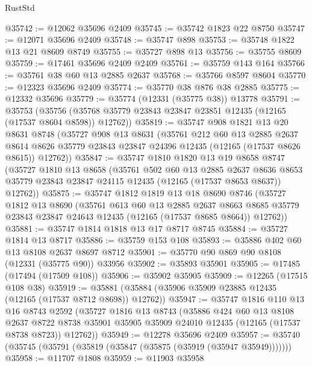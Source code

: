 \begin{lexlean}{RustStd}
\begin{coremodule}
@35742 := @12062 @35696 @2409
@35745 := @35742 @1823 @22 @8750
@35747 := @12071 @35696 @2409
@35748 := @35747 @898
@35753 := @35748 @1822 @13 @21 @8609 @8749
@35755 := @35727 @898 @13
@35756 := @35755 @8609
@35759 := @17461 @35696 @2409 @2409
@35761 := @35759 @143 @164
@35766 := @35761 @38 @60 @13 @2885 @2637
@35768 := @35766 @8597 @8604
@35770 := @12323 @35696 @2409
@35774 := @35770 @38 @876 @38 @2885
@35775 := @12332 @35696
@35779 := @35774 (@12331 (@35775 @38)) @13778
@35791 := @35753
    (@35756 (@35768 @35779 @23843 @23847 @23851 @12435 (@12165 (@17537 @8604 @8598)) @12762))
@35819 := @35747
    @908
    @1821
    @13
    @20
    @8631
    @8748
    (@35727
      @908
      @13
      @8631
      (@35761
        @212
        @60
        @13
        @2885
        @2637
        @8614
        @8626
        @35779
        @23843
        @23847
        @24396
        @12435
        (@12165 (@17537 @8626 @8615))
        @12762))
@35847 := @35747
    @1810
    @1820
    @13
    @19
    @8658
    @8747
    (@35727
      @1810
      @13
      @8658
      (@35761
        @502
        @60
        @13
        @2885
        @2637
        @8636
        @8653
        @35779
        @23843
        @23847
        @24115
        @12435
        (@12165 (@17537 @8653 @8637))
        @12762))
@35875 := @35747
    @1812
    @1819
    @13
    @18
    @8690
    @8746
    (@35727
      @1812
      @13
      @8690
      (@35761
        @613
        @60
        @13
        @2885
        @2637
        @8663
        @8685
        @35779
        @23843
        @23847
        @24643
        @12435
        (@12165 (@17537 @8685 @8664))
        @12762))
@35881 := @35747 @1814 @1818 @13 @17 @8717 @8745
@35884 := @35727 @1814 @13 @8717
@35886 := @35759 @153 @108
@35893 := @35886 @402 @60 @13 @8108 @2637 @8697 @8712
@35901 := @35770 @90 @869 @90 @8108 (@12331 (@35775 @90)) @33956
@35902 := @35893 @35901
@35905 := @17485 (@17494 (@17509 @108))
@35906 := @35902 @35905
@35909 := @12265 (@17515 @108 @38)
@35919 := @35881 (@35884 (@35906 @35909 @23885 @12435 (@12165 (@17537 @8712 @8698)) @12762))
@35947 := @35747
    @1816
    @110
    @13
    @16
    @8743
    @2592
    (@35727
      @1816
      @13
      @8743
      (@35886
        @424
        @60
        @13
        @8108
        @2637
        @8722
        @8738
        @35901
        @35905
        @35909
        @24010
        @12435
        (@12165 (@17537 @8738 @8723))
        @12762))
@35949 := @12278 @35696 @2409
@35957 := @35740 (@35745 (@35791 (@35819 (@35847 (@35875 (@35919 (@35947 @35949)))))))
@35958 := @11707 @1808
@35959 := @11903 @35958

\end{coremodule}
\end{lexlean}
